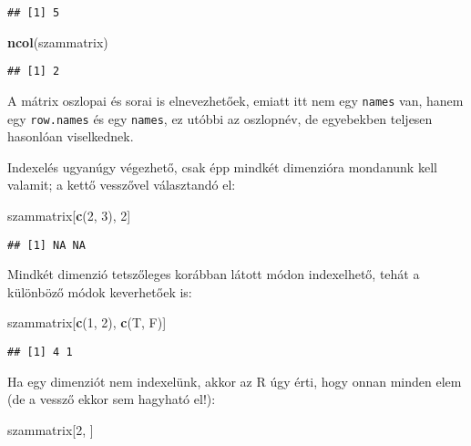 \documentclass[]{book}
\newenvironment{Shaded}{\begin{snugshade}}{\end{snugshade}}
\newcommand{\KeywordTok}[1]{\textcolor[rgb]{0.13,0.29,0.53}{\textbf{#1}}}
\newcommand{\DecValTok}[1]{\textcolor[rgb]{0.00,0.00,0.81}{#1}}
\newcommand{\NormalTok}[1]{#1}
\begin{document}
\begin{verbatim}
## [1] 5
\end{verbatim}

\begin{Shaded}
\begin{Highlighting}[]
\KeywordTok{ncol}\NormalTok{(szammatrix)}
\end{Highlighting}
\end{Shaded}

\begin{verbatim}
## [1] 2
\end{verbatim}

A mátrix oszlopai és sorai is elnevezhetőek, emiatt itt nem egy
\texttt{names} van, hanem egy \texttt{row.names} és egy \texttt{names},
ez utóbbi az oszlopnév, de egyebekben teljesen hasonlóan viselkednek.

Indexelés ugyanúgy végezhető, csak épp mindkét dimenzióra mondanunk kell
valamit; a kettő vesszővel választandó el:

\begin{Shaded}
\begin{Highlighting}[]
\NormalTok{szammatrix[}\KeywordTok{c}\NormalTok{(}\DecValTok{2}\NormalTok{, }\DecValTok{3}\NormalTok{), }\DecValTok{2}\NormalTok{]}
\end{Highlighting}
\end{Shaded}

\begin{verbatim}
## [1] NA NA
\end{verbatim}

Mindkét dimenzió tetszőleges korábban látott módon indexelhető, tehát a
különböző módok keverhetőek is:

\begin{Shaded}
\begin{Highlighting}[]
\NormalTok{szammatrix[}\KeywordTok{c}\NormalTok{(}\DecValTok{1}\NormalTok{, }\DecValTok{2}\NormalTok{), }\KeywordTok{c}\NormalTok{(T, F)]}
\end{Highlighting}
\end{Shaded}

\begin{verbatim}
## [1] 4 1
\end{verbatim}

Ha egy dimenziót nem indexelünk, akkor az R úgy érti, hogy onnan minden
elem (de a vessző ekkor sem hagyható el!):

\begin{Shaded}
\begin{Highlighting}[]
\NormalTok{szammatrix[}\DecValTok{2}\NormalTok{, ]}
\end{Highlighting}
\end{Shaded}
\end{document}
